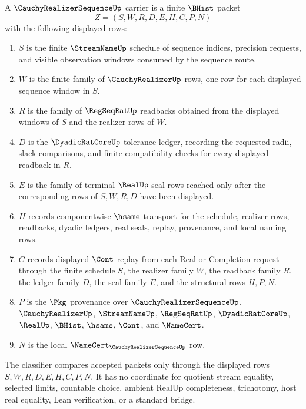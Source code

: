 \begin{definition}
\label{def:cauchy-realizer-sequence-carrier}
A $\CauchyRealizerSequenceUp$ carrier is a finite $\BHist$ packet
$$
Z=(S,W,R,D,E,H,C,P,N)
$$
with the following displayed rows:
\begin{enumerate}
\item $S$ is the finite $\StreamNameUp$ schedule of sequence indices, precision requests, and visible observation windows consumed by the sequence route.
\item $W$ is the finite family of $\CauchyRealizerUp$ rows, one row for each displayed sequence window in $S$.
\item $R$ is the family of $\RegSeqRatUp$ readbacks obtained from the displayed windows of $S$ and the realizer rows of $W$.
\item $D$ is the $\DyadicRatCoreUp$ tolerance ledger, recording the requested radii, slack comparisons, and finite compatibility checks for every displayed readback in $R$.
\item $E$ is the family of terminal $\RealUp$ seal rows reached only after the corresponding rows of $S,W,R,D$ have been displayed.
\item $H$ records componentwise $\hsame$ transport for the schedule, realizer rows, readbacks, dyadic ledgers, real seals, replay, provenance, and local naming rows.
\item $C$ records displayed $\Cont$ replay from each Real or Completion request through the finite schedule $S$, the realizer family $W$, the readback family $R$, the ledger family $D$, the seal family $E$, and the structural rows $H,P,N$.
\item $P$ is the $\Pkg$ provenance over $\CauchyRealizerSequenceUp$, $\CauchyRealizerUp$, $\StreamNameUp$, $\RegSeqRatUp$, $\DyadicRatCoreUp$, $\RealUp$, $\BHist$, $\hsame$, $\Cont$, and $\NameCert$.
\item $N$ is the local $\NameCert_{\CauchyRealizerSequenceUp}$ row.
\end{enumerate}
The classifier compares accepted packets only through the displayed rows $S,W,R,D,E,H,C,P,N$. It has no coordinate for quotient stream equality, selected limits, countable choice, ambient RealUp completeness, trichotomy, host real equality, Lean verification, or a standard bridge.
\end{definition}

